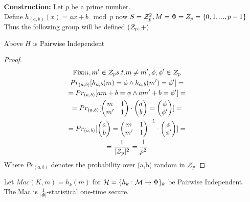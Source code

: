 \textbf{Construction: } Let $p$ be a prime number.\\
Define $h_{(a,b)}(x)=ax+b \mod p$ now $S=\mathcal{Z}_p^2, M=\Phi=Z_p=\{0,1,...,p-1\}$
Thus the following group will be defined $(\mathcal{Z}_p,+)$

\begin{theorem}
    Above $H$ is Pairwise Independent
\end{theorem}
\begin{proof}
    \begin{gather*}
        \text{Fix} m,m' \in \mathcal{Z}_p s.t. m\neq m', \phi,\phi' \in \mathcal{Z}_p\\
        Pr_{(a,b)}[h_{a,b}(m)=\phi \wedge h_{a,b}(m')=\phi']=\\
        =Pr_{(a,b)}[am+b=\phi \wedge am'+b=\phi']=\\
        =Pr_{(a,b)}[
        \begin{pmatrix}
            m & 1 \\
            m' & 1
        \end{pmatrix}
        \cdot
        \begin{pmatrix}
            a \\
            b
        \end{pmatrix}
        =
        \begin{pmatrix}
            \phi \\
            \phi'
        \end{pmatrix}
        ]=\\
        =Pr_{(a,b)}[
        \begin{pmatrix}
            a \\
            b
        \end{pmatrix}
        =
        \begin{pmatrix}
            m & 1 \\
            m' & 1
        \end{pmatrix}^{-1}
        \cdot
        \begin{pmatrix}
            \phi \\
            \phi'
        \end{pmatrix}
        ]=\\
        =\frac{1}{|\mathcal{Z}_p|^2}=\frac{1}{p^2}
    \end{gather*}
    Where $Pr_{(a,b)}$ denotes the probability over (a,b) random in $\mathcal{Z}_p$
\end{proof}

\begin{theorem}
    Let $Mac(K,m)=h_k(m)$ for $\mathcal{H}=\{h_k:\mathcal{M} \to \Phi \}_k$ be Pairwise Independent. The Mac is $\frac{1}{|\Phi|}$-statistical one-time secure. 
\end{theorem}

